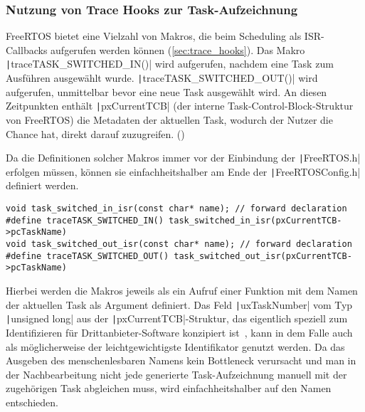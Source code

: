 \subsubsection{Nutzung von Trace Hooks zur Task-Aufzeichnung}

FreeRTOS bietet eine Vielzahl von Makros, die beim Scheduling als ISR-Callbacks
aufgerufen werden können (\ref{sec:trace_hooks}). Das Makro
\texttt|traceTASK_SWITCHED_IN()| wird aufgerufen, nachdem eine Task zum
Ausführen ausgewählt wurde. \texttt|traceTASK_SWITCHED_OUT()| wird
aufgerufen, unmittelbar bevor eine neue Task ausgewählt wird. An diesen
Zeitpunkten enthält \texttt|pxCurrentTCB| (der interne
Task-Control-Block-Struktur von FreeRTOS) die Metadaten der aktuellen Task,
wodurch der Nutzer die Chance hat, direkt darauf zuzugreifen.
(\cite{freertos_rtos_trace_hooks})

Da die Definitionen solcher Makros immer vor der Einbindung der
\texttt|FreeRTOS.h| erfolgen müssen, können sie einfachheitshalber
am Ende der \texttt|FreeRTOSConfig.h| definiert werden.

\begin{code}
\begin{verbatim}
void task_switched_in_isr(const char* name); // forward declaration
#define traceTASK_SWITCHED_IN() task_switched_in_isr(pxCurrentTCB->pcTaskName)
void task_switched_out_isr(const char* name); // forward declaration
#define traceTASK_SWITCHED_OUT() task_switched_out_isr(pxCurrentTCB->pcTaskName)
\end{verbatim}
\end{code}

Hierbei werden die Makros jeweils als ein Aufruf einer Funktion mit dem Namen
der aktuellen Task als Argument definiert. Das Feld
\texttt|uxTaskNumber| vom Typ \texttt|unsigned long| aus der
\texttt|pxCurrentTCB|-Struktur, das eigentlich speziell zum
Identifizieren für Drittanbieter-Software konzipiert
ist~\cite{freertos_task_c_410}, kann in dem Falle auch als möglicherweise der
leichtgewichtigste Identifikator genutzt werden. Da das Ausgeben des
menschenlesbaren Namens kein Bottleneck verursacht und man in der
Nachbearbeitung nicht jede generierte Task-Aufzeichnung manuell mit der
zugehörigen Task abgleichen muss, wird einfachheitshalber auf den Namen
entschieden.
